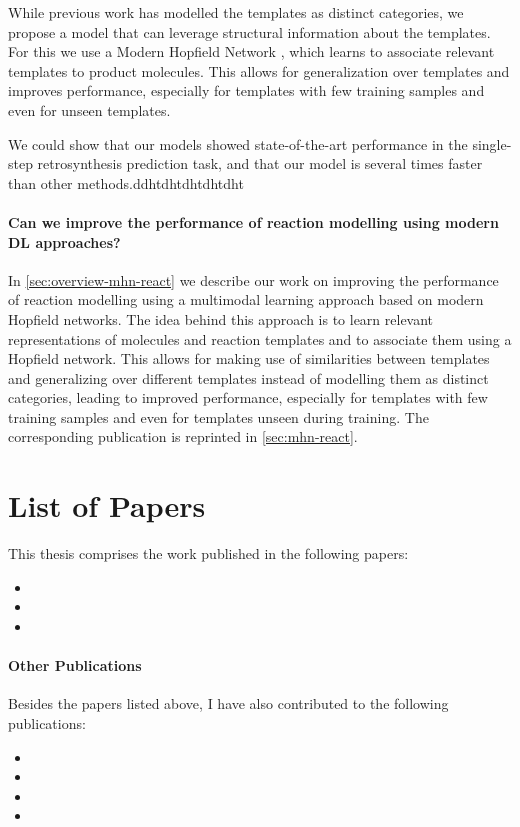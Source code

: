 While previous work has modelled the templates as distinct categories, we
propose a model that can leverage structural information about the templates.
For this we use a Modern Hopfield Network \citep{ramsauerHopfieldNetworksAll2020}, which
learns to associate relevant templates to product molecules.
This allows for generalization over templates and improves performance, especially
for templates with few training samples and even for unseen templates.

We could show that our models showed state-of-the-art performance in
the single-step retrosynthesis prediction task, and that our model is several
times faster than other methods.ddhtdhtdhtdhtdht

\paragraph{Can we improve the performance of reaction modelling using modern DL approaches?}
In \cref{sec:overview-mhn-react} we describe our work on improving the performance
of reaction modelling using a multimodal learning approach based on modern
Hopfield networks. The idea behind this approach is to learn relevant representations
of molecules and reaction templates and to associate them using a Hopfield network.
This allows for making use of similarities between templates and generalizing over
different templates instead of modelling them as distinct categories, leading to
improved performance, especially for templates with few training samples and even
for templates unseen during training.
The corresponding publication is reprinted in \cref{sec:mhn-react}.

\section{List of Papers}
This thesis comprises the work published in the following papers:

\begin{itemize}
    \item {}
    \item {}
    \item {}
\end{itemize}

\paragraph{Other Publications} Besides the papers listed above, I have also
contributed to the following publications:

\begin{itemize}
    \item {}
    \item {}
    \item {}
    \item {}
\end{itemize}